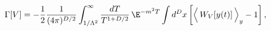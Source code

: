 \begin{equation}
\Gamma[V]=-\frac{1}{2} \frac{1}{(4\pi)^{D/2}} \int_{1/\Lambda^2}^\infty
\frac{dT}{T^{1+D/2}} \, \E^{-m^2T}\int d^D x 
\left[\Big\langle \,W_V[y(t)]\, \Big\rangle_y -1\right], \label{1.3}
\end{equation}


